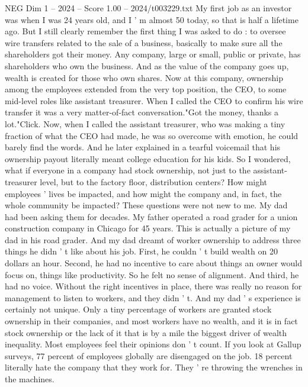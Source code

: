 \begin{textsample}{NEG Dim 1 – 2024 – Score 1.00 – 2024/t003229.txt}  \label{ex:f1_neg_031}
My first job as an investor was when I was 24 years old, and I ' m almost 50 today, so that is half a lifetime ago.
But I still clearly remember the first thing I was asked to do : to oversee wire transfers related to the sale of a business, basically to make sure all the shareholders got their money.
Any company, large or small, public or private, has shareholders who own the business.
And as the value of the company goes up, wealth is created for those who own shares.
Now at this company, ownership among the employees extended from the very top position, the CEO, to some mid-level roles like assistant treasurer.
When I called the CEO to confirm his wire transfer it was a very matter-of-fact conversation."Got the money, thanks a lot."Click.
Now, when I called the assistant treasurer, who was making a tiny fraction of what the CEO had made, he was so overcome with emotion, he could barely find the words.
And he later explained in a tearful voicemail that his ownership payout literally meant college education for his kids.
So I wondered, what if everyone in a company had stock ownership, not just to the assistant-treasurer level, but to the factory floor, distribution centers?
How might employees ' lives be impacted, and how might the company and, in fact, the whole community be impacted?
These questions were not new to me.
My dad had been asking them for decades.
My father operated a road grader for a union construction company in Chicago for 45 years.
This is actually a picture of my dad in his road grader.
And my dad dreamt of worker ownership to address three things he didn ' t like about his job.
First, he couldn ' t build wealth on 20 dollars an hour.
Second, he had no incentive to care about things an owner would focus on, things like productivity.
So he felt no sense of alignment.
And third, he had no voice.
Without the right incentives in place, there was really no reason for management to listen to workers, and they didn ' t.
And my dad ' s experience is certainly not unique.
Only a tiny percentage of workers are granted stock ownership in their companies, and most workers have no wealth, and it is in fact stock ownership or the lack of it that is by a mile the biggest driver of wealth inequality.
Most employees feel their opinions don ' t count.
If you look at Gallup surveys, 77 percent of employees globally are disengaged on the job. 18 percent literally hate the company that they work for.
They ' re throwing the wrenches in the machines.

\end{textsample}
